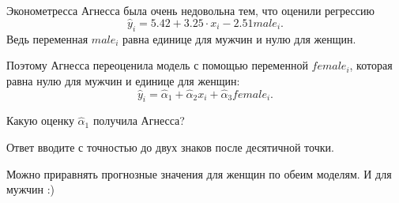 
\begin{question}
Эконометресса Агнесса была очень недовольна тем, что оценили регрессию
\[
\hat y_i = 5.42 + 3.25 \cdot x_i - 2.51 male_i.
\]
Ведь переменная \(male_i\) равна единице для мужчин и нулю для женщин.

Поэтому Агнесса переоценила модель с помощью переменной \(female_i\),
которая равна нулю для мужчин и единице для женщин:
\[
\hat y_i = \hat\alpha_1 + \hat\alpha_2 x_i + \hat\alpha_3 female_i.
\]

Какую оценку \(\hat\alpha_1\) получила Агнесса?

Ответ вводите с точностью до двух знаков после десятичной точки.
\end{question}

\begin{solution}
Можно приравнять прогнозные значения для женщин по обеим моделям. И для мужчин :)
\end{solution}

